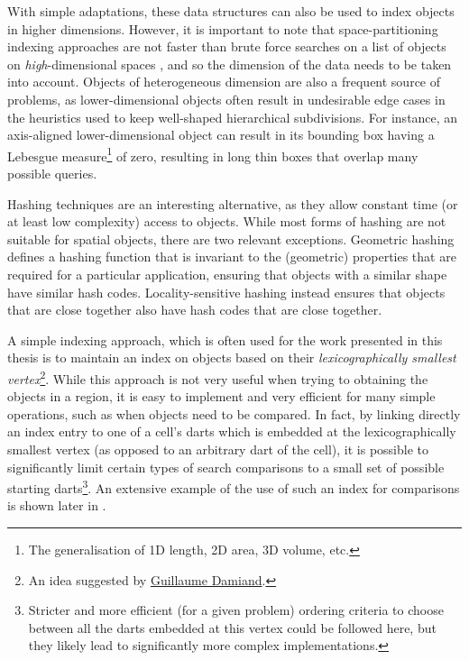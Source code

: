 With simple adaptations, these data structures can also be used to index objects in higher dimensions.
However, it is important to note that space-partitioning indexing approaches are not faster than brute force searches on a list of objects on \emph{high}-dimensional spaces \citep{Weber98}, and so the dimension of the data needs to be taken into account.
Objects of heterogeneous dimension are also a frequent source of problems, as lower-dimensional objects often result in undesirable edge cases in the heuristics used to keep well-shaped hierarchical subdivisions.
For instance, an axis-aligned lower-dimensional object can result in its bounding box having a Lebesgue measure\footnote{The generalisation of 1D length, 2D area, 3D volume, etc.} of zero, resulting in long thin boxes that overlap many possible queries.

Hashing techniques are an interesting alternative, as they allow constant time (or at least low complexity)  access to objects.
While most forms of hashing are not suitable for spatial objects, there are two relevant exceptions.
Geometric hashing \citep{Wolfson97} defines a hashing function that is invariant to the (geometric) properties that are required for a particular application, ensuring that objects with a similar shape have similar hash codes.
Locality-sensitive hashing \citep{Andoni08} instead ensures that objects that are close together also have hash codes that are close together.

A simple indexing approach, which is often used for the work presented in this thesis is to maintain an index on objects based on their \emph{lexicographically smallest vertex}\footnote{An idea suggested by \href{http://liris.cnrs.fr/guillaume.damiand/}{Guillaume Damiand}.}.
While this approach is not very useful when trying to obtaining the objects in a region, it is easy to implement and very efficient for many simple operations, such as when objects need to be compared.
In fact, by linking directly an index entry to one of a cell's darts which is embedded at the lexicographically smallest vertex (as opposed to an arbitrary dart of the cell), it is possible to significantly limit certain types of search comparisons to a small set of possible starting darts\footnote{Stricter and more efficient (for a given problem) ordering criteria to choose between all the darts embedded at this vertex could be followed here, but they likely lead to significantly more complex implementations.}.
An extensive example of the use of such an index for comparisons is shown later in .


